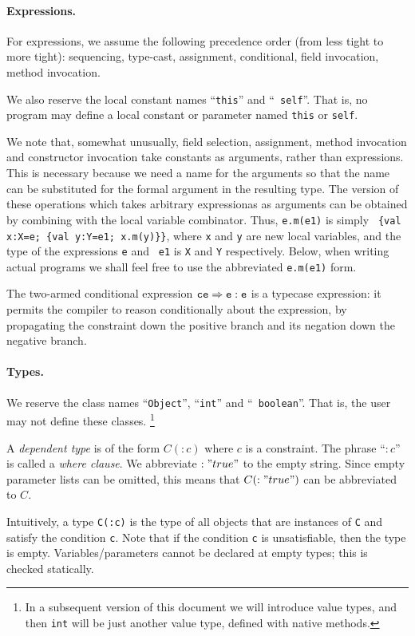 \documentclass[nocopyrightspace,preprint,10pt]{sigplanconf}
\newcommand\Implies{\Rightarrow}
\begin{document}
\paragraph{Expressions.}
For expressions, we assume the following precedence order (from less
tight to more tight): sequencing, type-cast, assignment, conditional,
field invocation, method invocation.

We also reserve the local constant names ``{\tt this}'' and ``{\tt
self}''. That is, no program may define a local constant or parameter
named {\tt this} or {\tt self}. 

We note that, somewhat unusually, field selection, assignment, method
invocation and constructor invocation take constants as arguments,
rather than expressions. This is necessary because we need a name for
the arguments so that the name can be substituted for the formal
argument in the resulting type. The version of these operations which
takes arbitrary expressionas as arguments can be obtained by combining
with the local variable combinator. Thus, {\tt e.m(e1)} is simply {\tt
\{val x:X=e; \{val y:Y=e1; x.m(y)\}\}}, where {\tt x} and {\tt y} are
new local variables, and the type of the expressions {\tt e} and {\tt
e1} is {\tt X} and {\tt Y} respectively. Below, when writing actual
programs we shall feel free to use the abbreviated {\tt e.m(e1)} form.

The two-armed conditional expression $\tt ce \Implies e : e$ is a
typecase expression: it permits the compiler to reason conditionally
about the expression, by propagating the constraint down the positive
branch and its negation down the negative branch.

\paragraph{Types.}
We reserve the class names ``{\tt Object}'', ``{\tt int}'' and ``{\tt
boolean}''. That is, the user may not define these
classes. \footnote{In a subsequent version of this document we will
introduce value types, and then {\tt int} will be just another value
type, defined with native methods.}

A {\em dependent type} is of the form $C(:c)$ where $c$ is a
constraint.  The phrase ``$:c$'' is called a {\em where
clause}. We abbreviate $:"true"$ to the empty string. Since
empty parameter lists can be omitted, this means that $C(:"true")$
can be abbreviated to $C$.

Intuitively, a type {\tt C(:c)} is the type of all objects that are
instances of {\tt C} and satisfy the condition {\tt c}. Note that if
the condition {\tt c} is unsatisfiable, then the type is
empty. Variables/parameters cannot be declared at empty types; this is
checked statically.
\end{document}
